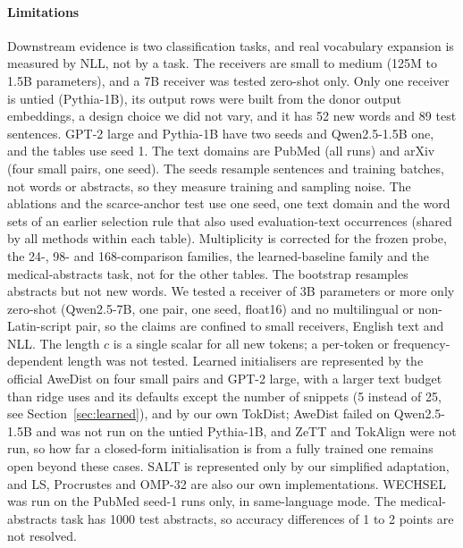 \documentclass[preprint,12pt]{elsarticle}
\begin{document}
\paragraph{Limitations} Downstream evidence is two classification tasks, and real vocabulary expansion is measured by NLL, not by a task. The receivers are small to medium (125M to 1.5B parameters), and a 7B receiver was tested zero-shot only. Only one receiver is untied (Pythia-1B), its output rows were built from the donor output embeddings, a design choice we did not vary, and it has 52 new words and 89 test sentences. GPT-2 large and Pythia-1B have two seeds and Qwen2.5-1.5B one, and the tables use seed 1. The text domains are PubMed (all runs) and arXiv (four small pairs, one seed). The seeds resample sentences and training batches, not words or abstracts, so they measure training and sampling noise. The ablations and the scarce-anchor test use one seed, one text domain and the word sets of an earlier selection rule that also used evaluation-text occurrences (shared by all methods within each table). Multiplicity is corrected for the frozen probe, the 24-, 98- and 168-comparison families, the learned-baseline family and the medical-abstracts task, not for the other tables. The bootstrap resamples abstracts but not new words. We tested a receiver of 3B parameters or more only zero-shot (Qwen2.5-7B, one pair, one seed, float16) and no multilingual or non-Latin-script pair, so the claims are confined to small receivers, English text and NLL. The length $c$ is a single scalar for all new tokens; a per-token or frequency-dependent length was not tested. Learned initialisers are represented by the official AweDist on four small pairs and GPT-2 large, with a larger text budget than ridge uses and its defaults except the number of snippets (5 instead of 25, see Section~\ref{sec:learned}), and by our own TokDist; AweDist failed on Qwen2.5-1.5B and was not run on the untied Pythia-1B, and ZeTT and TokAlign were not run, so how far a closed-form initialisation is from a fully trained one remains open beyond these cases. SALT is represented only by our simplified adaptation, and LS, Procrustes and OMP-32 are also our own implementations. WECHSEL was run on the PubMed seed-1 runs only, in same-language mode. The medical-abstracts task has 1000 test abstracts, so accuracy differences of 1 to 2 points are not resolved.
\end{document}
